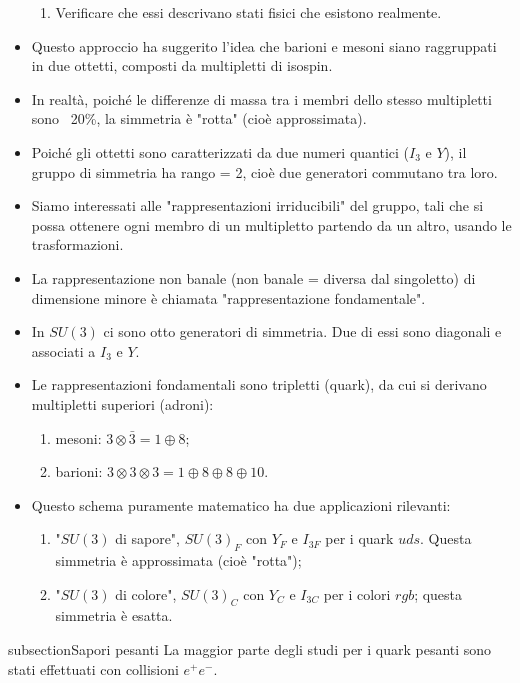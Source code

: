 \begin{itemize}
\begin{enumerate}
    \item Verificare che essi descrivano stati fisici che esistono realmente.  
\end{enumerate}
\item Questo approccio ha suggerito l'idea che barioni e mesoni siano raggruppati in due ottetti, composti da multipletti di isospin.
\item In realtà, poiché le differenze di massa tra i membri dello stesso multipletti sono ~20\%, la simmetria è "rotta" (cioè approssimata).  
\item Poiché gli ottetti sono caratterizzati da due numeri quantici (\( I_3 \) e \( Y \)), il gruppo di simmetria ha rango = 2, cioè due generatori commutano tra loro.  
\item Siamo interessati alle "rappresentazioni irriducibili" del gruppo, tali che si possa ottenere ogni membro di un multipletto partendo da un altro, usando le trasformazioni.
\item La rappresentazione non banale (non banale = diversa dal singoletto) di dimensione minore è chiamata "rappresentazione fondamentale".  
\item In $SU(3)$ ci sono otto generatori di simmetria. Due di essi sono diagonali e associati a \( I_3 \) e \( Y \).  
\item Le rappresentazioni fondamentali sono tripletti (quark), da cui si derivano multipletti superiori (adroni):  
\begin{enumerate}
    \item mesoni: \( 3 \otimes \bar{3} = 1 \oplus 8 \);   
    \item barioni: \( 3 \otimes 3 \otimes 3 = 1 \oplus 8 \oplus 8 \oplus 10 \).  
\end{enumerate}
\item Questo schema puramente matematico ha due applicazioni rilevanti:  
\begin{enumerate}
    \item "$SU(3)$ di sapore", \( SU(3)_F \) con \( Y_F \) e \( I_{3F} \) per i quark $uds$. Questa simmetria è approssimata (cioè "rotta");
    \item "$SU(3)$ di colore", \( SU(3)_C \) con \( Y_C \) e \( I_{3C} \) per i colori $rgb$; questa simmetria è esatta.
\end{enumerate}  
\end{itemize}
subsection{Sapori pesanti}
La maggior parte degli studi per i quark pesanti sono stati effettuati con collisioni $e^+e^-$.
